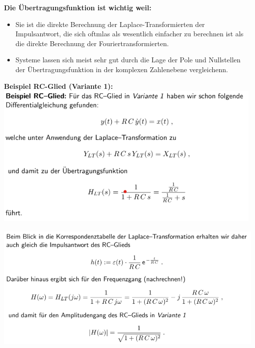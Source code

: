 \documentclass[12pt,a4paper]{scrartcl}
\begin{document}
  \noindent \textbf{Die Übertragungsfunktion ist wichtig weil:}
  \begin{itemize}
    \item Sie ist die direkte Berechnung der Laplace-Transformierten der Impulsantwort, die sich oftmlas als wesentlich einfacher zu berechnen ist als die direkte Berechnung der Fouriertransformierten.
    \item Systeme lassen sich meist sehr gut durch die Lage der Pole und Nullstellen der Übertragungsfunktion in der komplexen Zahlenebene vergleichenn. 
  \end{itemize}

  \noindent \textbf{Beispiel RC-Glied (Variante 1):}\\
  \includegraphics[height=7cm]{Pictures/BeispielVariante1.png} \\
  \includegraphics[height=7cm]{Pictures/BeispielVariante12.png} \\
\end{document}
